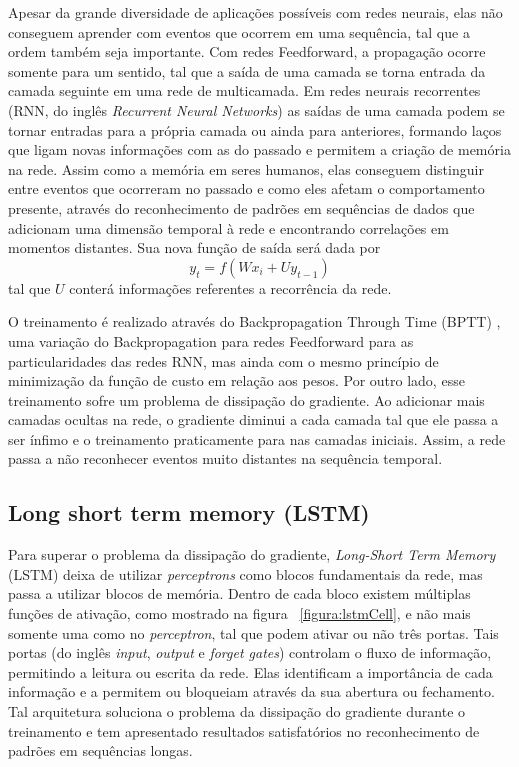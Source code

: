 \documentclass[
	12pt,				%
	oneside,			%
	a4paper,			%
	english,			%
	brazil				%
	]{abntex2}
\begin{document}
	Apesar da grande diversidade de aplicações possíveis com redes neurais, elas não conseguem aprender com eventos que ocorrem em uma sequência, tal que a ordem também seja importante. Com redes Feedforward, a propagação ocorre somente para um sentido, tal que a saída de uma camada se torna entrada da camada seguinte em uma rede de multicamada. Em redes neurais recorrentes (RNN, do inglês \textit{Recurrent Neural Networks}) \cite{elman1990finding} as saídas de uma camada podem se tornar entradas para a própria camada ou ainda para anteriores, formando laços que ligam novas informações com as do passado e permitem a criação de memória na rede. Assim como a memória em seres humanos, elas conseguem distinguir entre eventos que ocorreram no passado e como eles afetam o comportamento presente, através do reconhecimento de padrões em sequências de dados que adicionam uma dimensão temporal à rede e encontrando correlações em momentos distantes. Sua nova função de saída será dada por $$ y_{t} = f(W x_{i} + U y _{t-1}) $$ tal que $ U $ conterá informações referentes a recorrência da rede. 
	
	O treinamento é realizado através do Backpropagation Through Time (BPTT) \cite{werbos1990backpropagation}, uma variação do Backpropagation para redes Feedforward para as particularidades das redes RNN, mas ainda com o mesmo princípio de minimização da função de custo em relação aos pesos. Por outro lado, esse treinamento sofre um problema de dissipação do gradiente. \cite{sutskever2013training} \cite{bengio1994learning} Ao adicionar mais camadas ocultas na rede, o gradiente diminui a cada camada tal que ele passa a ser ínfimo e o treinamento praticamente para nas camadas iniciais. Assim, a rede passa a não reconhecer eventos muito distantes na sequência temporal. \cite{glorot2010understanding}
		
		\subsection{Long short term memory (LSTM)}
	
	Para superar o problema da dissipação do gradiente, \textit{Long-Short Term Memory} (LSTM)\cite{hochreiter1997long} \cite{gers1999learning} deixa de utilizar \textit{perceptrons} como blocos fundamentais da rede, mas passa a utilizar blocos de memória. Dentro de cada bloco existem múltiplas funções de ativação, como mostrado na figura ~\ref{figura:lstmCell}, e não mais somente uma como no \textit{perceptron}, tal que podem ativar ou não três portas. Tais portas (do inglês \textit{input}, \textit{output} e \textit{forget gates}) controlam o fluxo de informação, permitindo a leitura ou escrita da rede. Elas identificam a importância de cada informação e a permitem ou bloqueiam através da sua abertura ou fechamento. Tal arquitetura soluciona o problema da dissipação do gradiente durante o treinamento e tem apresentado resultados satisfatórios no reconhecimento de padrões em sequências longas. \cite{gers2001long} \cite{greff2017lstm} \cite{sutskever2014sequence}
	
\end{document}
